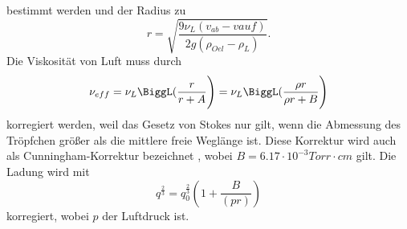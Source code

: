 bestimmt werden und der Radius zu
\begin{equation}
    r = \sqrt{\frac{9 \nu_L (v_{ab}-v{auf})}{2 g (\rho_{Oel}-\rho_L)}}.
    \label{eqn:Radius}
\end{equation}
Die Viskosität von Luft muss durch 
\begin{equation}
    \nu_{eff} = \nu_L \BiggL(\frac{r}{r + A}\Biggr) = \nu_L \BiggL(\frac{\rho r}{\rho r + B}\Biggr)
    \label{eqn:nu_kor}
\end{equation}
korregiert werden, weil das Gesetz von Stokes nur gilt, wenn die Abmessung des Tröpfchen größer als die mittlere
freie Weglänge ist. Diese Korrektur wird auch als Cunningham-Korrektur bezeichnet , wobei $B = 6.17 \cdot 10^{-3} Torr \cdot cm$ gilt.
Die Ladung wird mit 
\begin{equation}
    q^{\frac{2}{3}} = q^{\frac{2}{3}}_0 (1 + \frac{B}{(p r)})
    \label{eqn:Ladung_kor}
\end{equation}
korregiert, wobei $p$ der Luftdruck ist.